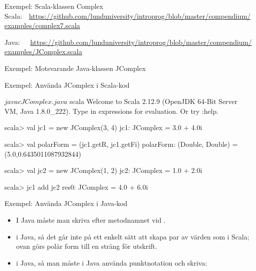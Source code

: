 \begin{Slide}{Exempel: Scala-klassen Complex}
{\SlideFontTiny Scala:~~\url{https://github.com/lunduniversity/introprog/blob/master/compendium/examples/complex7.scala}}

{\SlideFontTiny Java:~~~\url{https://github.com/lunduniversity/introprog/blob/master/compendium/examples/JComplex.scala}}

\end{Slide}
  

\begin{Slide}{Exempel: Motsvarande Java-klassen JComplex}\SlideFontTiny\SlideOnly{\vspace{-1em}}
\end{Slide}

  
  


\begin{Slide}{Exempel: Använda JComplex i Scala-kod}
\begin{REPL}
$ javac JComplex.java
$ scala
Welcome to Scala 2.12.9 (OpenJDK 64-Bit Server VM, Java 1.8.0_222).
Type in expressions for evaluation. Or try :help.

scala> val jc1 = new JComplex(3, 4)
jc1: JComplex = 3.0 + 4.0i

scala> val polarForm = (jc1.getR, jc1.getFi)
polarForm: (Double, Double) = (5.0,0.6435011087932844)

scala> val jc2 = new JComplex(1, 2)
jc2: JComplex = 1.0 + 2.0i

scala> jc1 add jc2
res0: JComplex = 4.0 + 6.0i
\end{REPL}
\end{Slide}




\begin{Slide}{Exempel: Använda JComplex i Java-kod}\SlideFontSmall
{}
\begin{itemize}
\item I Java måste man skriva  efter metodnamnet vid .

\item {} i Java, så det går inte på ett enkelt sätt att skapa par av värden som i Scala; ovan görs polär form till en sträng för utskrift.

\item {} i Java, så man måste i Java använda punktnotation och skriva: 
\end{itemize}
\end{Slide}
  
